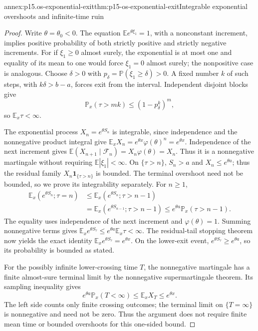 \begin{annexitem}{annex:p15.os-exponential-exit}{thm:p15-os-exponential-exit}{Integrable exponential overshoots and infinite-time ruin}
\begin{proof}
Write \(\theta=\theta_0<0\).
The equation \(\mathbb Ee^{\theta\xi_1}=1\), with a
nonconstant increment, implies positive probability of both
strictly positive and strictly negative increments.
For if \(\xi_1\geq0\) almost surely, the exponential is at
most one and equality of its mean to one would force
\(\xi_1=0\) almost surely; the nonpositive case is analogous.
Choose \(\delta>0\) with
\(p_\delta=\mathbb P(\xi_1\geq\delta)>0\).
A fixed number \(k\) of such steps, with \(k\delta>b-a\),
forces exit from the interval. Independent disjoint blocks give
\[
 \mathbb P_x(\tau>mk)\leq(1-p_\delta^k)^m,
 \]
so \(\mathbb E_x\tau<\infty\).

The exponential process \(X_n=e^{\theta S_n}\) is integrable,
since independence and the nonnegative product integral give
\(\mathbb E_xX_n=e^{\theta x}\varphi(\theta)^n=e^{\theta x}\).
Independence of the next increment gives
\(\mathbb E(X_{n+1}\mid\mathcal F_n)=X_n\varphi(\theta)=X_n\).
Thus it is a nonnegative martingale without requiring
\(\mathbb E|\xi_1|<\infty\).
On \(\{\tau>n\}\), \(S_n>a\) and
\(X_n\leq e^{\theta a}\); thus the residual family
\(X_n\mathbf1_{\{\tau>n\}}\) is bounded.
The terminal overshoot need not be bounded, so we prove
its integrability separately. For \(n\geq1\),
\[
 \begin{split}
 \mathbb E_x(e^{\theta S_n};\tau=n)
 &\leq\mathbb E_x(e^{\theta S_n};\tau>n-1)\\
 &=\mathbb E_x(e^{\theta S_{n-1}};\tau>n-1)
 \leq e^{\theta a}\mathbb P_x(\tau>n-1).
 \end{split}
 \]
The equality uses independence of the next increment and
\(\varphi(\theta)=1\).
Summing nonnegative terms gives
\(\mathbb E_xe^{\theta S_\tau}\leq e^{\theta a}\mathbb E_x\tau<\infty\).
The residual-tail stopping theorem now yields the exact identity
\(\mathbb E_xe^{\theta S_\tau}=e^{\theta x}\).
On the lower-exit event,
\(e^{\theta S_\tau}\geq e^{\theta a}\), so its probability
is bounded as stated.

For the possibly infinite lower-crossing time \(T\), the
nonnegative martingale has a finite almost-sure terminal limit
by the nonnegative supermartingale theorem.
Its sampling inequality gives
\[
 e^{\theta a}\mathbb P_x(T<\infty)
 \leq\mathbb E_x X_T\leq e^{\theta x}.
 \]
The left side counts only finite crossing outcomes; the terminal
limit on \(\{T=\infty\}\) is nonnegative and need not be zero.
Thus the argument does not require finite mean time or bounded
overshoots for this one-sided bound.
\end{proof}
\end{annexitem}

